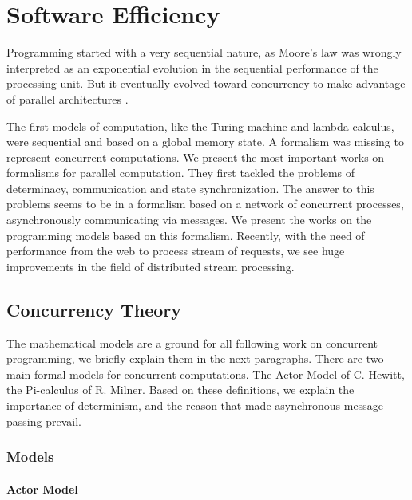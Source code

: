 \section{Software Efficiency} \label{chapter3:parallel-execution}

Programming started with a very sequential nature, as Moore's law \cite{Moore1965} was wrongly interpreted as an exponential evolution in the sequential performance of the processing unit.
But it eventually evolved toward concurrency to make advantage of parallel architectures \cite{Flynn1972}.

The first models of computation, like the Turing machine and lambda-calculus, were sequential and based on a global memory state.
A formalism was missing to represent concurrent computations.
We present the most important works on formalisms for parallel computation.
They first tackled the problems of determinacy, communication and state synchronization.
The answer to this problems seems to be in a formalism based on a network of concurrent processes, asynchronously communicating via messages.
We present the works on the programming models based on this formalism.
Recently, with the need of performance from the web to process stream of requests, we see huge improvements in the field of distributed stream processing.

\subsection{Concurrency Theory} \label{chapter3:parallel-execution:concurrency-theory}

The mathematical models are a ground for all following work on concurrent programming, we briefly explain them in the next paragraphs.
There are two main formal models for concurrent computations.
The Actor Model of C. Hewitt, the Pi-calculus of R. Milner.
Based on these definitions, we explain the importance of determinism, and the reason that made asynchronous message-passing prevail.


\subsubsection{Models}

\paragraph{Actor Model}

